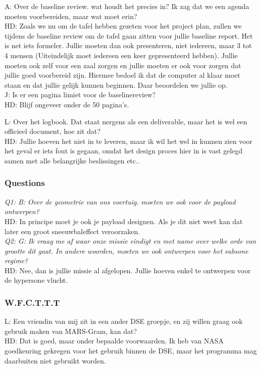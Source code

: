 A: Over de baseline review. wat houdt het precies in? Ik zag dat we een agenda moeten voorbereiden, maar wat moet erin?\\
HD: Zoals we nu om de tafel hebben gezeten voor het project plan, zullen we tijdens de baseline review om de tafel gaan zitten voor jullie baseline report. Het is net iets formeler. Jullie moeten dan ook presenteren, niet iedereen, maar 3 tot 4 mensen (Uiteindelijk moet iedereen een keer gepresenteerd hebben). Jullie moeten ook zelf voor een zaal zorgen en jullie moeten er ook voor zorgen dat jullie goed voorbereid zijn. Hiermee bedoel ik dat de computer al klaar moet staan en dat jullie gelijk kunnen beginnen. Daar beoordelen we jullie op.\\
J: Is er een pagina limiet voor de baselinereview?\\
HD: Blijf ongeveer onder de 50 pagina's.

L: Over het logbook. Dat staat nergens als een deliverable, maar het is wel een officieel document, hoe zit dat?\\
HD: Jullie hoeven het niet in te leveren, maar ik wil het wel in kunnen zien voor het geval er iets fout is gegaan, omdat het design proces hier in is vast gelegd samen met alle belangrijke beslissingen etc..\\

\subsubsection{Questions}
\textit{Q1: B: Over de geometrie van ons voertuig. moeten we ook voor de payload ontwerpen?}\\
HD: In principe moet je ook je payload designen. Als je dit niet weet kan dat later een groot sneeuwbaleffect veroorzaken.\\

\textit{Q2: G: Ik vraag me af waar onze missie eindigt en met name over welke orde van grootte dit gaat. In andere woorden, moeten we ook ontwerpen voor het subsone regime?}\\
HD: Nee, dan is jullie missie al afgelopen. Jullie hoeven enkel te ontwerpen voor de hypersone vlucht.\\

\subsubsection{W.F.C.T.T.T}
L: Een vriendin van mij zit in een ander DSE groepje, en zij willen graag ook gebruik maken van MARS-Gram, kan dat?\\
HD: Dat is goed, maar onder bepaalde voorwaarden. Ik heb van NASA goedkeuring gekregen voor het gebruik binnen de DSE, maar het programma mag daarbuiten niet gebruikt worden.\\

